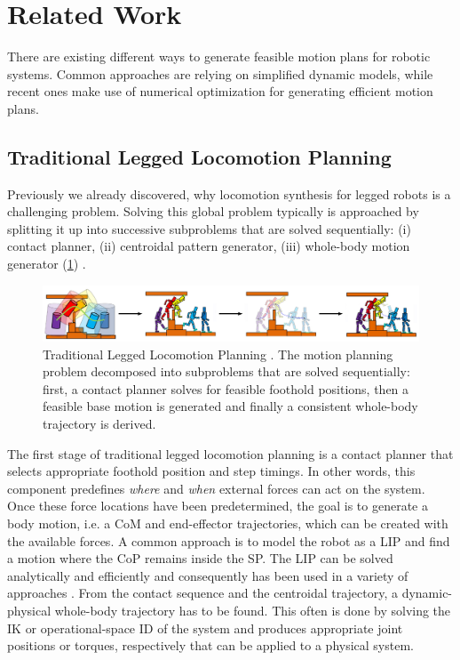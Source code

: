 \section{Related Work}\label{sec:IntroRelated}
There are existing different ways to generate feasible motion plans for robotic systems. Common approaches are relying on simplified dynamic models, while recent ones make use of numerical optimization for generating efficient motion plans. 

\subsection{Traditional Legged Locomotion Planning}
Previously we already discovered, why locomotion synthesis for legged robots is a challenging problem. Solving this global problem typically is approached by splitting it up into successive subproblems that are solved sequentially: (i) contact planner, (ii) centroidal pattern generator, (iii) whole-body motion generator (\cref{img:traditional_locomotion_planner}) \cite{carpentier2017multi}. 

\begin{figure}
\centering	
\includegraphics[width=1\textwidth]{img/intro/traditional_locomotion_planner}
\caption[Traditional Legged Locomotion Planning]{Traditional Legged Locomotion Planning \cite{giraud2020motion}. The motion planning problem decomposed into subproblems that are solved sequentially: first, a contact planner solves for feasible foothold positions, then a feasible base motion is generated and finally a consistent whole-body trajectory is derived.}
\label{img:traditional_locomotion_planner}
\end{figure} 
 
The first stage of traditional legged locomotion planning is a contact planner that selects appropriate foothold position and step timings. In other words, this component predefines \textit{where} and \textit{when} external forces can act on the system. 
Once these force locations have been predetermined, the goal is to generate a body motion, i.e. a \gls{CoM} and end-effector trajectories, which can be created with the available forces. A common approach is to model the robot as a \gls{LIP} and find a motion where the \gls{CoP} remains inside the \gls{SP}. The \gls{LIP} can be solved analytically and efficiently and consequently has been used in a variety of approaches \cite{kajita2003biped, kalakrishnan2010fast, winkler2015planning, bellicoso2017dynamic}. 
From the contact sequence and the centroidal trajectory, a dynamic-physical whole-body trajectory has to be found. This often is done by solving the \gls{IK} \cite{espiau1992new} or operational-space \gls{ID} \cite{khatib1987unified} of the system and produces appropriate joint positions or torques, respectively that can be applied to a physical system.

